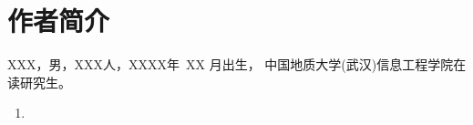 \chapter*{作者简介}
\begin{spacing}{1.3}
\xiaosi
XXX，男，XXX人，XXXX年~XX 月出生，
中国地质大学(武汉)信息工程学院在读研究生。
% 
\end{spacing}
\begin{enumerate}
\item 
\end{enumerate}
